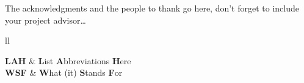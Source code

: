 \documentclass[
11pt, %
oneside, %
english, %
singlespacing, %
headsepline, %
]{MastersDoctoralThesis} %
\begin{document}

\begin{abstract}
\addchaptertocentry{\abstractname} %

TODO: Add abstract\\[1cm]


\begin{flushright}
{\normalsize Kouros Georgios \par} %
{\normalsize Electrical and Computer Engineering Department \par} %
{\normalsize Aristotle University of Thessaloniki, Greece \par} %
{\normalsize August, 2016}
\end{flushright}

\end{abstract}


\begin{acknowledgements}
\addchaptertocentry{\acknowledgementname} %

The acknowledgments and the people to thank go here, don't forget to include your project advisor\ldots

\end{acknowledgements}


\tableofcontents %

\listoffigures %

\listoftables %


\begin{abbreviations}{ll} %

\textbf{LAH} & \textbf{L}ist \textbf{A}bbreviations \textbf{H}ere\\
\textbf{WSF} & \textbf{W}hat (it) \textbf{S}tands \textbf{F}or\\

\end{abbreviations}
\end{document}
